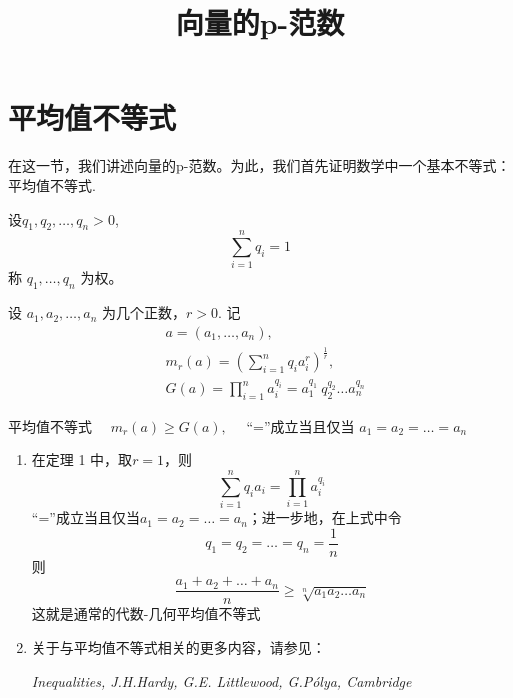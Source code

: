 \documentclass{article}
\title{向量的p-范数}
\author{}
\date{}
\begin{document}
\maketitle

\section{平均值不等式}
在这一节，我们讲述向量的p-范数。为此，我们首先证明数学中一个基本不等式：平均值不等式.

设\(q_1,q_2,\dots ,q_n > 0\),
\begin{equation*}
    \sum_{i=1}^n q_i = 1
\end{equation*}
称 \(q_1,\dots ,q_n\) 为权。

\vspace{10pt}

设 \(a_1,a_2,\dots ,a_n\) 为几个正数，\(r > 0\). 记
\begin{align*}
    & a =(a_1,\dots ,a_n), \\
    & m_r(a) =(\sum_{i=1}^n q_i a_i^r)^{\frac{1}{r}}, \\
    & G(a) = \prod_{i=1}^n a_i^{q_i} = a_1^{q_1} \ q_2^{q_2} \dots a_n^{q_n}
\end{align*}

\begin{theorem}{平均值不等式}{}
    \(\quad m_r(a) \ge G(a),\quad \) “=”成立当且仅当 \(a_1 = a_2 = \dots = a_n\)
\end{theorem}


\vspace{20pt}

\begin{remark}
    \begin{enumerate}
        \item 在定理 1 中，取\(r = 1\)，则
            \begin{equation*}
                \sum_{i=1}^n q_i a_i = \prod_{i=1}^n a_i^{q_i}
            \end{equation*}
            “=”成立当且仅当\(a_1 = a_2 = \dots = a_n\)；进一步地，在上式中令
            \begin{equation*}
                q_1 = q_2 = \dots = q_n = \frac{1}{n}
            \end{equation*}
            则
            \begin{equation*}
                \frac{a_1 + a_2 + \dots + a_n}{n} \ge \sqrt[n]{a_1 a_2 \dots a_n}
            \end{equation*}
            这就是通常的代数-几何平均值不等式

        \item 关于与平均值不等式相关的更多内容，请参见：

        \textit{Inequalities, J.H.Hardy, G.E. Littlewood, G.Pólya, Cambridge}
    \end{enumerate}
\end{remark}
\end{document}
